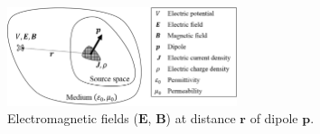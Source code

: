 \begin{figure}[!h]
\centering
\includegraphics[width=0.6\textwidth,keepaspectratio]{images/Quasi-statics.png} %
\centering
\caption{Electromagnetic fields ($\boldsymbol{E}$, $\boldsymbol{B}$) at distance $\boldsymbol{r}$ of dipole $\boldsymbol{p}$.}
\label{fig:quasi-static}
\end{figure}